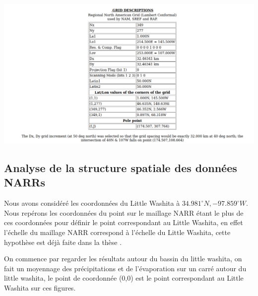 \documentclass[a4paper,10pt]{article}
\begin{document}
	
	\begin{center}
		\label{maillage NARR}
		\includegraphics[scale=0.4]{grid_prop.png}
	\end{center} 
	
	\subsection{Analyse de la structure spatiale des données NARRs}
	\label{spat-NARR}
	
	Nous avons considéré les coordonnées du Little Washita à $34.981^{\circ}N,-97.859^{\circ}W$. Nous repérons les coordonnées du point sur le maillage NARR étant le plus de ces coordonnées pour définir le point correspondant au Little Washita, en effet l'échelle du maillage NARR correspond à l'échelle du Little Washita, cette hypothèse est déjà faite dans la thèse \cite{maquin2016developpement}. 
	
	On commence par regarder les résultats autour du bassin du little washita, on fait un moyennage des précipitations et de l'évaporation sur un carré autour du little washita, le point de coordonnée (0,0) est le point correspondant au Little Washita sur ces figures. 
	
\end{document}
